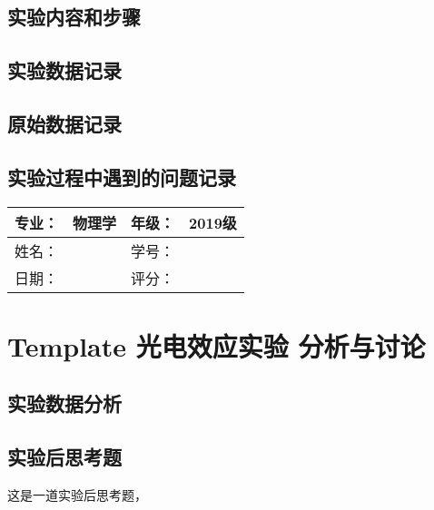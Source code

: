\documentclass[dvipsnames, svgnames,a4paper,11pt]{article}
\begin{document}
\subsection{实验内容和步骤}
\subsection{实验数据记录}
\subsection{原始数据记录}
\subsection{实验过程中遇到的问题记录}



\clearpage
\begin{table}
	\renewcommand\arraystretch{1.7}
	\begin{tabularx}{\textwidth}{|X|X|X|X|}
	\hline
	专业：& 物理学 &年级：& 2019级\\
	\hline
	姓名： & & 学号：& \\
	\hline
    日期：& & 评分： &\\
	\hline
	\end{tabularx}
\end{table}

\section{Template 光电效应实验 \quad\heiti 分析与讨论}
\subsection{实验数据分析}
\subsection{实验后思考题}
\begin{question}
	这是一道实验后思考题，\lipsum[20]
\end{question}

\clearpage
{}



\clearpage
\appendix
\appendixpage
\addappheadtotoc
\end{document}
